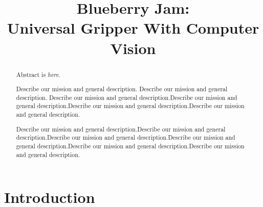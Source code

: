 \documentclass[conference,a4paper]{IEEEtran}
\begin{document}
\title{Blueberry Jam: \\Universal Gripper With Computer Vision} 

 \author{%
 }


\maketitle

\begin{abstract}
  Abstract is \emph{here}.
  
  Describe our mission and general description. Describe our mission and general description. Describe our mission and general description.Describe our mission and general description.Describe our mission and general description.Describe our mission and general description.
  
  Describe our mission and general description.Describe our mission and general description.Describe our mission and general description.Describe our mission and general description.Describe our mission and general description.Describe our mission and general description.
\end{abstract}


\section{Introduction}
\end{document}

